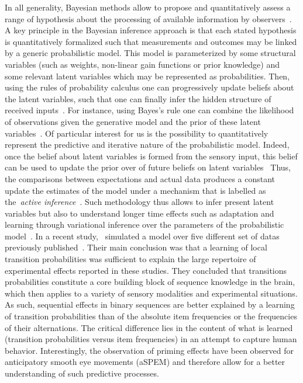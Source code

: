 \documentclass[profile,final,english, draft]{article}%
\newcommand{\citep}[1]{\parencite{#1}}
\newcommand{\citet}[1]{\textcite{#1}}
\begin{document}
In all generality, Bayesian methods allow to propose and quantitatively assess
a range of hypothesis about the processing
of available information by observers~\citep{Deneve1999, Diaconescu2014, Deaunizau}.
A key principle in the Bayesian inference approach is
that each stated hypothesis is quantitatively formalized
such that measurements and outcomes may be linked by
a generic probabilistic model. %
This model is parameterized by some structural variables
(such as weights, non-linear gain functions or prior knowledge)
and some relevant latent variables
which may be represented as probabilities.
Then, using the rules of probability calculus
one can progressively update beliefs about the latent variables,
such that one can finally infer the hidden structure of received inputs~\citep{Hoyer2003, Ma2014}.
For instance, using Bayes's rule one can combine
the likelihood of observations given the generative model and
the prior of these latent variables~\citep{Janes2014}.
Of particular interest for us is the possibility to
quantitatively represent
the predictive and iterative nature of the probabilistic model.
Indeed, once the belief about latent variables
is formed from the sensory input,
this belief can be used to update
the prior over of future beliefs on latent variables~\citep{Montagnini2007}
Thus, the comparisons between expectations and actual data produces
a constant update the estimates of the model under a mechanism
that is labelled as the~\textit{active inference}~\citep{Friston2003, Friston2010}.
Such methodology thus allows to infer present latent variables
but also to understand longer time effects such as adaptation and learning
through variational inference over
the parameters of the probabilistic model~\citep{ref}.
In a recent study,~\citet{Meyniel2016} simulated
a model over five different set of datas
previously published~\citep{Squires1976, Huettel2002, Kolossa2013, Cho2002, Falk1997}.
Their main conclusion was that
a learning of local transition probabilities
was sufficient to explain the large repertoire
of experimental effects reported in these studies.
They concluded that transitions probabilities constitute
a core building block of sequence knowledge in the brain,
which then applies to a variety of sensory modalities and
experimental situations.
As such, sequential effects in binary sequences are better explained
by a learning of transition probabilities
than of the absolute item frequencies or the frequencies of their alternations.
The critical difference lies in the content
of what is learned (transition probabilities versus item frequencies)
in an attempt to capture human behavior.
Interestingly, the observation of priming effects
have been observed for anticipatory smooth eye movements (aSPEM)
and therefore allow for a better understanding of such predictive processes. %
\end{document}
